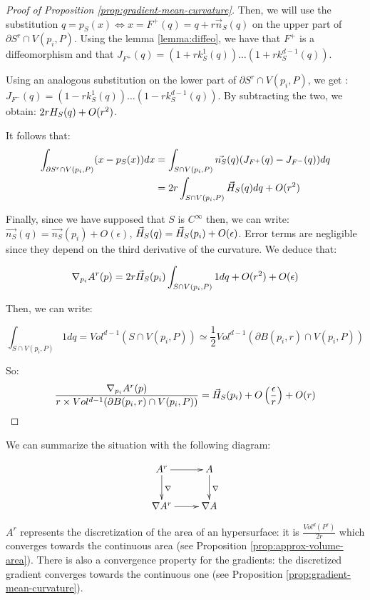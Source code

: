 \begin{proof}[Proof of Proposition \ref{prop:gradient-mean-curvature}]
Then, we will use the substitution $ q = p_S(x) \iff x = F^{+}(q) = q +
r \vec{n}_S(q) $ on the upper part of $ \partial{S^r} \cap V(p_i, P) $. Using
the lemma \ref{lemma:diffeo}, we have that $ F^{+} $ is a diffeomorphism and that
$ J_{F^+}(q) = (1 + r k^1_S(q)) \hdots (1 + r k^{d-1}_S(q)) $.

Using an analogous substitution on the lower part of $ \partial{S^r} \cap V(p_i,
P) $, we get : $ J_{F^-}(q) = (1 - r k^1_S(q)) \hdots (1 - r k^{d-1}_S(q)) $. By
subtracting the two, we obtain: $ 2 r H_{S}(q) + O(r^2) $.

It follows that:
\begin{align*}
    \int_{\partial{S^r} \cap V(p_i, P)} (x - p_S(x)) dx &= \int_{S \cap V(p_i, P)}
    \vec{n_S}(q) ( J_{F^+}(q) -J_{F^-}(q) ) dq \\
    &= 2r \int_{S \cap V(p_i, P)} \vec{H}_{S}(q) dq + O(r^2) \\
\end{align*}

Finally, since we have supposed that $ S $ is $ C^{\infty} $ then, we can write:
$ \vec{n_S}(q) = \vec{n_S}(p_i) + O(\epsilon) $, $ \vec{H}_{S}(q) = \vec{H}_{S}(p_i)
+ O(\epsilon) $. Error terms are negligible since they depend on the third derivative
of the curvature. We deduce that:

$$ \nabla_{p_i} A^r(p) = 2r \vec{H}_{S}(p_i) \int_{S \cap V(p_i, P)} 1 dq + O(r^2)
+ O(\epsilon) $$

Then, we can write:

$$ \int_{S \cap V(p_i, P)} 1 dq = Vol^{d-1}(S\cap V(p_i,P)) \simeq \frac{1}{2}
    Vol^{d-1}(\partial B(p_i,r) \cap V(p_i,P)) $$

So:
\begin{equation*}
    \frac{\nabla_{p_i} A^r(p)}{r \times Vol^{d-1}(\partial B(p_i,r) \cap V(p_i,P))}
    = \vec{H}_{S}(p_i) + O \left(\frac{\epsilon}{r}\right) + O(r) \qedhere
\end{equation*}

\end{proof}

We can summarize the situation with the following diagram:

\begin{displaymath}
    \xymatrix{A^r \ar[d]^{\nabla} \ar[r] & A \ar[d]^{\nabla} \\
        \nabla A^r \ar[r] & \nabla A }
\end{displaymath}

$ A^r $ represents the discretization of the area of an hypersurface: it
is $ \frac{Vol^d(P^r)}{2r} $ which converges towards the continuous area (see
Proposition \ref{prop:approx-volume-area}). There is also a convergence property
for the gradients: the discretized gradient converges towards the continuous one
(see Proposition \ref{prop:gradient-mean-curvature}).

